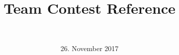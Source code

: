 \documentclass[a4paper,9pt]{scrartcl}
\title{Team Contest Reference}
\author{\teamname \\ \university}
\date{26. November 2017}
\begin{document}
\maketitle
\setlength{\columnsep}{1cm}

\begin{multicols*}{2}
  
  
  
  
  
  
\end{multicols*}
\end{document}
